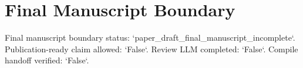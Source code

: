 \section{Final Manuscript Boundary}
Final manuscript boundary status: `paper\_draft\_final\_manuscript\_incomplete`. Publication-ready claim allowed: `False`. Review LLM completed: `False`. Compile handoff verified: `False`.

